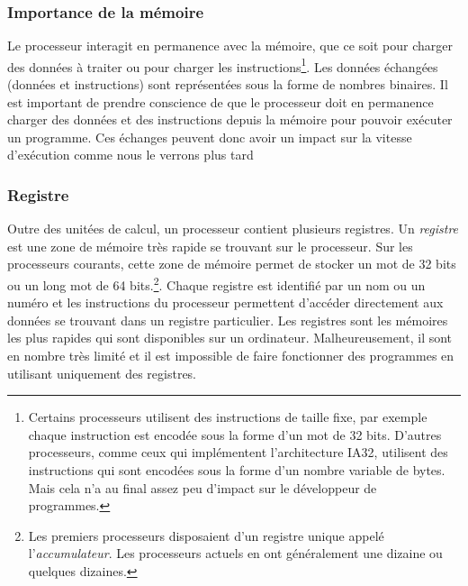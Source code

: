 \subsubsection*{Importance de la mémoire}
Le processeur interagit en permanence avec la mémoire, que ce soit pour charger des données à traiter ou pour charger les instructions\footnote{Certains processeurs utilisent des instructions de taille fixe, par exemple chaque instruction est encodée sous la forme d'un mot de 32 bits.
  D'autres processeurs, comme ceux qui implémentent l'architecture IA32, utilisent des instructions qui sont encodées sous la forme d'un nombre variable de bytes.
Mais cela n'a au final assez peu d'impact sur le développeur de programmes.}.
Les données échangées (données et instructions) sont représentées sous la forme de nombres binaires.
Il est important de prendre conscience de que le processeur doit en permanence charger des données et des instructions depuis la mémoire pour pouvoir exécuter un programme.
Ces échanges peuvent donc avoir un impact sur la vitesse d'exécution comme nous le verrons plus tard

\subsubsection*{Registre}
Outre des unitées de calcul, un processeur contient plusieurs registres.
Un \textit{registre} est une zone de mémoire très rapide se trouvant sur le processeur.
Sur les processeurs courants, cette zone de mémoire permet de stocker un mot de 32 bits ou un long mot de 64 bits.\footnote{Les premiers processeurs disposaient d'un registre unique appelé l'\textit{accumulateur}.
Les processeurs actuels en ont généralement une dizaine ou quelques dizaines.}.
Chaque registre est identifié par un nom ou un numéro et les instructions du processeur permettent d'accéder directement aux données se trouvant dans un registre particulier.
Les registres sont les mémoires les plus rapides qui sont disponibles sur un ordinateur.
Malheureusement, il sont en nombre très limité et il est impossible de faire fonctionner des programmes en utilisant uniquement des registres.

